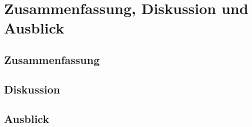 \chapter{Zusammenfassung, Diskussion und Ausblick}


\section{Zusammenfassung}


\section{Diskussion}


\section{Ausblick}

